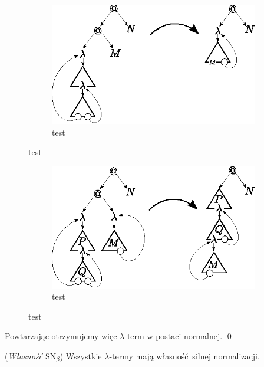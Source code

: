 \begin{dowod}
\begin{figure}[htb]
\end{figure}
\begin{figure}[htb]\ContinuedFloat
  \centering
  \vspace{1em}
  \begin{subfigure}{0.55\textwidth}
    \includegraphics[width=1\linewidth]{../reduction2}
    \caption{test}
  \end{subfigure}

\end{figure}
\begin{figure}[htb]\ContinuedFloat
  \centering
  \begin{subfigure}{0.55\textwidth}
    \includegraphics[width=1\linewidth]{../reduction3}
    \caption{test}
  \end{subfigure}
  \caption{test}
\end{figure}
\clearpage 
  Powtarzając otrzymujemy więc \(\lambda\)-term w postaci normalnej. \qed

\end{dowod}
\begin{twierdzenie} 
  (\emph{Własność \(\mathrm{SN}_{\beta}\)}) Wszystkie \(\lambda\)-termy mają własność silnej normalizacji.
\end{twierdzenie}
